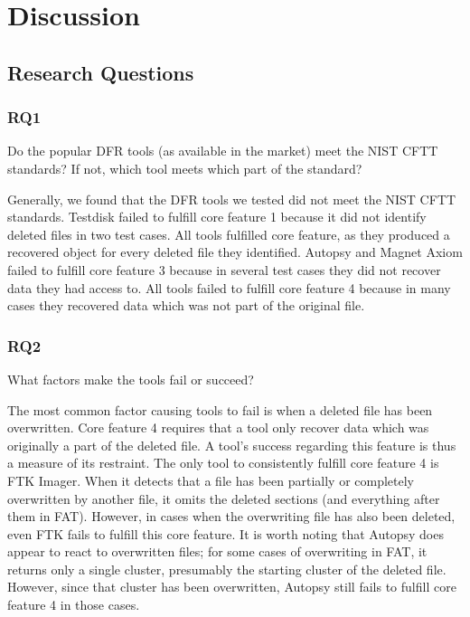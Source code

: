 \section{Discussion}

\subsection{Research Questions}
\subsubsection{RQ1}
Do the popular DFR tools (as available in the market) meet the NIST CFTT standards? 
If not, which tool meets which part of the standard? 

Generally, we found that the DFR tools we tested did not meet the NIST CFTT standards.
Testdisk failed to fulfill core feature 1 because it did not identify deleted files in two test cases.
All tools fulfilled core feature, as they produced a recovered object for every deleted file they identified.
Autopsy and Magnet Axiom failed to fulfill core feature 3 because in several test cases they did not recover data they had access to.
All tools failed to fulfill core feature 4 because in many cases they recovered data which was not part of the original file.

\subsubsection{RQ2}
What factors make the tools fail or succeed?

The most common factor causing tools to fail is when a deleted file has been overwritten.
Core feature 4 requires that a tool only recover data which was originally a part of the deleted file.
A tool's success regarding this feature is thus a measure of its restraint.
The only tool to consistently fulfill core feature 4 is FTK Imager.
When it detects that a file has been partially or completely overwritten by another file, it omits the deleted sections (and everything after them in FAT).
However, in cases when the overwriting file has also been deleted, even FTK fails to fulfill this core feature.
It is worth noting that Autopsy does appear to react to overwritten files; for some cases of overwriting in FAT, it returns only a single cluster, presumably the starting cluster of the deleted file.
However, since that cluster has been overwritten, Autopsy still fails to fulfill core feature 4 in those cases.

